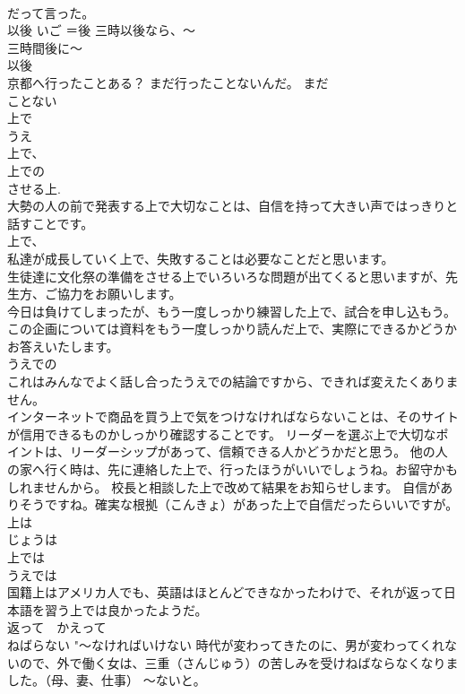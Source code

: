 \documentclass[8pt]{extreport}
\begin{document}
\begin{CJK}{UTF8}{min}
\\	だって言った。 
\\	以後	いご ＝後 三時以後なら、～ 
\\	三時間後に～　
\\	以後 
\\	京都へ行ったことある？ まだ行ったことないんだ。 まだ　
\\	ことない 
\\	上で	
\\	うえ 
\\	上で、
\\	上での
\\	させる上. 
\\	大勢の人の前で発表する上で大切なことは、自信を持って大きい声ではっきりと話すことです。 
\\	上で、
\\	私達が成長していく上で、失敗することは必要なことだと思います。 
\\	生徒達に文化祭の準備をさせる上でいろいろな問題が出てくると思いますが、先生方、ご協力をお願いします。 
\\	今日は負けてしまったが、もう一度しっかり練習した上で、試合を申し込もう。 
\\	この企画については資料をもう一度しっかり読んだ上で、実際にできるかどうかお答えいたします。 
\\	うえでの
\\	これはみんなでよく話し合ったうえでの結論ですから、できれば変えたくありません。 
\\	インターネットで商品を買う上で気をつけなければならないことは、そのサイトが信用できるものかしっかり確認することです。 リーダーを選ぶ上で大切なポイントは、リーダーシップがあって、信頼できる人かどうかだと思う。 他の人の家へ行く時は、先に連絡した上で、行ったほうがいいでしょうね。お留守かもしれませんから。 校長と相談した上で改めて結果をお知らせします。 自信がありそうですね。確実な根拠（こんきょ）があった上で自信だったらいいですが。 
\\	上は　　
\\	じょうは 
\\	上では　　
\\	うえでは 
\\	国籍上はアメリカ人でも、英語はほとんどできなかったわけで、それが返って日本語を習う上では良かったようだ。 
\\	返って　かえって 
\\	ねばらない	"～なければいけない 時代が変わってきたのに、男が変わってくれないので、外で働く女は、三重（さんじゅう）の苦しみを受けねばならなくなりました。（母、妻、仕事） ～ないと。

\end{CJK}
\end{document}
